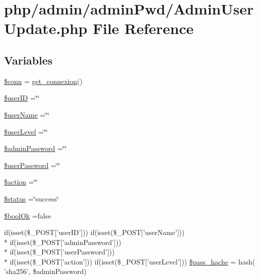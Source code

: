 \hypertarget{_admin_user_update_8php}{\section{php/admin/admin\-Pwd/\-Admin\-User\-Update.php File Reference}
\label{_admin_user_update_8php}
}
\subsection*{Variables}
\begin{DoxyCompactItemize}
\item 
\hyperlink{_admin_user_update_8php_aa8a5a87b9c1a6a0819b88447cbe41877}{\$conn} = \hyperlink{php__functions_8php_ace18bc10f3fd08f92688ac743e0d8c2e}{get\-\_\-connexion}()
\item 
\hyperlink{_admin_user_update_8php_aea70bbe59be6896e9cbbb9811a864ee8}{\$user\-I\-D} =\char`\"{}\char`\"{}
\item 
\hyperlink{_admin_user_update_8php_aff20833df389a26c0f9384512eec4a68}{\$user\-Name} =\char`\"{}\char`\"{}
\item 
\hyperlink{_admin_user_update_8php_aaeb0a34550135c6f3caac7aa1db9b0ae}{\$user\-Level} =\char`\"{}\char`\"{}
\item 
\hyperlink{_admin_user_update_8php_a5718fc74710979724218d4ebd530c0cf}{\$admin\-Password} =\char`\"{}\char`\"{}
\item 
\hyperlink{_admin_user_update_8php_a35248a9b2cd0ce90d3712a1a5b6eb161}{\$user\-Password} =\char`\"{}\char`\"{}
\item 
\hyperlink{_admin_user_update_8php_aa698a3e72116e8e778be0e95d908ee30}{\$action} =\char`\"{}\char`\"{}
\item 
\hyperlink{_admin_user_update_8php_a58391ea75f2d29d5d708d7050b641c33}{\$status} =\char`\"{}success\char`\"{}
\item 
\hyperlink{_admin_user_update_8php_a33e92d112f4ecaf9f88cfee111d7ffdf}{\$bool\-Ok} =false
\item 
if(isset(\$\-\_\-\-P\-O\-S\-T\mbox{[}'user\-I\-D'\mbox{]})) if(isset(\$\-\_\-\-P\-O\-S\-T\mbox{[}'user\-Name'\mbox{]})) \\*
if(isset(\$\-\_\-\-P\-O\-S\-T\mbox{[}'admin\-Password'\mbox{]})) \\*
if(isset(\$\-\_\-\-P\-O\-S\-T\mbox{[}'user\-Password'\mbox{]})) \\*
if(isset(\$\-\_\-\-P\-O\-S\-T\mbox{[}'action'\mbox{]})) if(isset(\$\-\_\-\-P\-O\-S\-T\mbox{[}'user\-Level'\mbox{]})) \hyperlink{_admin_user_update_8php_a844eaca485688be8060f60120beede86}{\$pass\-\_\-hache} = hash( 'sha256', \$admin\-Password)

\end{DoxyCompactItemize}
